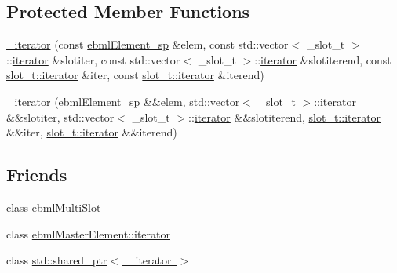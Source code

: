 \subsection*{Protected Member Functions}
\begin{DoxyCompactItemize}
\item 
\mbox{\hyperlink{classebml_1_1ebmlMultiSlot_1_1__iterator_ad4c2e04a5cf2b94c9abb9a14bf64f017}{\+\_\+iterator}} (const \mbox{\hyperlink{namespaceebml_adad533b7705a16bb360fe56380c5e7be}{ebml\+Element\+\_\+sp}} \&elem, const std\+::vector$<$ \+\_\+slot\+\_\+t $>$\+::\mbox{\hyperlink{classebml_1_1ebmlMasterElement_1_1iterator}{iterator}} \&slotiter, const std\+::vector$<$ \+\_\+slot\+\_\+t $>$\+::\mbox{\hyperlink{classebml_1_1ebmlMasterElement_1_1iterator}{iterator}} \&slotiterend, const \mbox{\hyperlink{classebml_1_1slot__t_1_1iterator}{slot\+\_\+t\+::iterator}} \&iter, const \mbox{\hyperlink{classebml_1_1slot__t_1_1iterator}{slot\+\_\+t\+::iterator}} \&iterend)
\item 
\mbox{\hyperlink{classebml_1_1ebmlMultiSlot_1_1__iterator_a74075a206c4d25bb335a79a4b471ef0b}{\+\_\+iterator}} (\mbox{\hyperlink{namespaceebml_adad533b7705a16bb360fe56380c5e7be}{ebml\+Element\+\_\+sp}} \&\&elem, std\+::vector$<$ \+\_\+slot\+\_\+t $>$\+::\mbox{\hyperlink{classebml_1_1ebmlMasterElement_1_1iterator}{iterator}} \&\&slotiter, std\+::vector$<$ \+\_\+slot\+\_\+t $>$\+::\mbox{\hyperlink{classebml_1_1ebmlMasterElement_1_1iterator}{iterator}} \&\&slotiterend, \mbox{\hyperlink{classebml_1_1slot__t_1_1iterator}{slot\+\_\+t\+::iterator}} \&\&iter, \mbox{\hyperlink{classebml_1_1slot__t_1_1iterator}{slot\+\_\+t\+::iterator}} \&\&iterend)
\end{DoxyCompactItemize}
\subsection*{Friends}
\begin{DoxyCompactItemize}
\item 
class \mbox{\hyperlink{classebml_1_1ebmlMultiSlot_1_1__iterator_ab14eb6c5a125d7276a7b4b5b6573428b}{ebml\+Multi\+Slot}}
\item 
class \mbox{\hyperlink{classebml_1_1ebmlMultiSlot_1_1__iterator_a7f678a46134f738b99dfff4aafa7fc5f}{ebml\+Master\+Element\+::iterator}}
\item 
class \mbox{\hyperlink{classebml_1_1ebmlMultiSlot_1_1__iterator_a6c39add7736de258762e32f3536f516a}{std\+::shared\+\_\+ptr$<$ \+\_\+iterator $>$}}
\end{DoxyCompactItemize}


